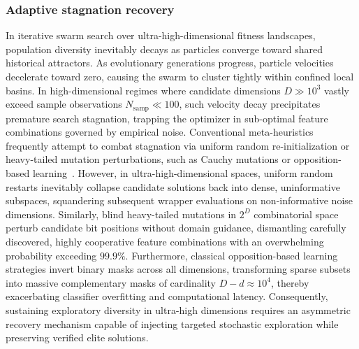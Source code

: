\subsubsection{Adaptive stagnation recovery}\label{sec:reinit}

In iterative swarm search over ultra-high-dimensional fitness landscapes, population diversity inevitably decays as particles converge toward shared historical attractors. As evolutionary generations progress, particle velocities decelerate toward zero, causing the swarm to cluster tightly within confined local basins. In high-dimensional regimes where candidate dimensions $D \gg 10^3$ vastly exceed sample observations $N_{\mathrm{samp}} \ll 100$, such velocity decay precipitates premature search stagnation, trapping the optimizer in sub-optimal feature combinations governed by empirical noise. Conventional meta-heuristics frequently attempt to combat stagnation via uniform random re-initialization or heavy-tailed mutation perturbations, such as Cauchy mutations or opposition-based learning~\cite{su2024,shikoun2024}. However, in ultra-high-dimensional spaces, uniform random restarts inevitably collapse candidate solutions back into dense, uninformative subspaces, squandering subsequent wrapper evaluations on non-informative noise dimensions. Similarly, blind heavy-tailed mutations in $2^D$ combinatorial space perturb candidate bit positions without domain guidance, dismantling carefully discovered, highly cooperative feature combinations with an overwhelming probability exceeding $99.9\%$. Furthermore, classical opposition-based learning strategies invert binary masks across all dimensions, transforming sparse subsets into massive complementary masks of cardinality $D - d \approx 10^4$, thereby exacerbating classifier overfitting and computational latency. Consequently, sustaining exploratory diversity in ultra-high dimensions requires an asymmetric recovery mechanism capable of injecting targeted stochastic exploration while preserving verified elite solutions.

